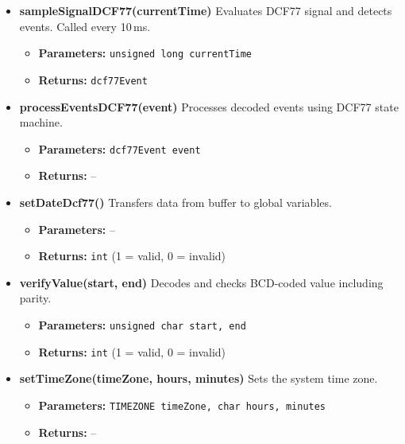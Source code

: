 \documentclass[a4paper,12pt]{article}
\begin{document}
\begin{itemize}
    \item \textbf{sampleSignalDCF77(currentTime)}  
    Evaluates DCF77 signal and detects events. Called every 10\,ms.  
    \begin{itemize}
        \item[] \textbf{Parameters:} \texttt{unsigned long currentTime}  
        \item[] \textbf{Returns:} \texttt{dcf77Event}
    \end{itemize}

    \item \textbf{processEventsDCF77(event)}  
    Processes decoded events using DCF77 state machine.  
    \begin{itemize}
        \item[] \textbf{Parameters:} \texttt{dcf77Event event}  
        \item[] \textbf{Returns:} --
    \end{itemize}
    \newpage
    \item \textbf{setDateDcf77()}  
    Transfers data from buffer to global variables.  
    \begin{itemize}
        \item[] \textbf{Parameters:} --  
        \item[] \textbf{Returns:} \texttt{int} (1 = valid, 0 = invalid)
    \end{itemize}

    \item \textbf{verifyValue(start, end)}  
    Decodes and checks BCD-coded value including parity.  
    \begin{itemize}
        \item[] \textbf{Parameters:} \texttt{unsigned char start, end}  
        \item[] \textbf{Returns:} \texttt{int} (1 = valid, 0 = invalid)
    \end{itemize}

    \item \textbf{setTimeZone(timeZone, hours, minutes)}  
    Sets the system time zone.  
    \begin{itemize}
        \item[] \textbf{Parameters:} \texttt{TIMEZONE timeZone, char hours, minutes}  
        \item[] \textbf{Returns:} --
    \end{itemize}
\end{itemize}

\newpage

\end{document}
